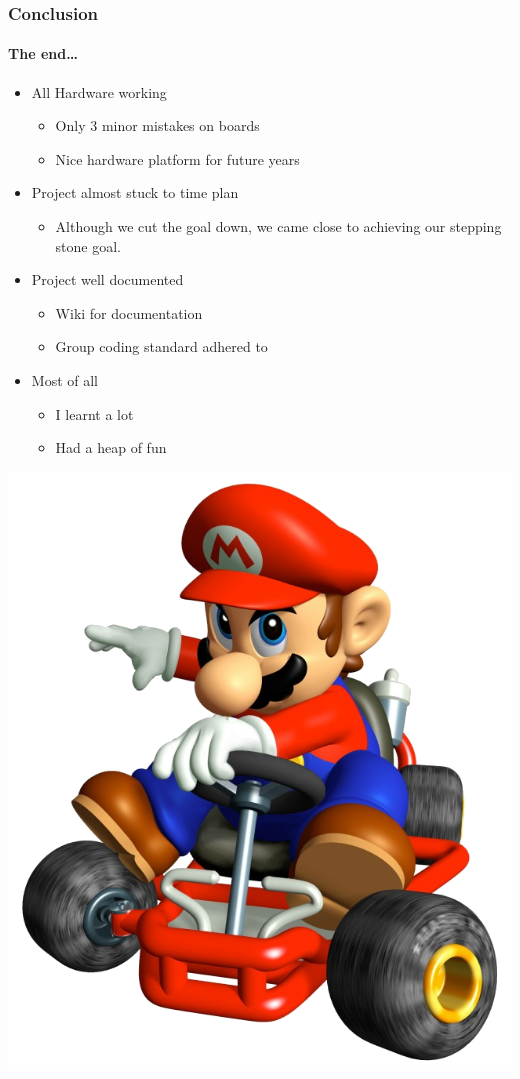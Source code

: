 \documentclass{beamer}
\begin{document}
\begin{frame}
\frametitle{Conclusion}
\framesubtitle{The end\ldots}
\begin{itemize}
\item All Hardware working
  \begin{itemize}
  \item Only 3 minor mistakes on boards
  \item Nice hardware platform for future years
  \end{itemize}
\item Project almost stuck to time plan
  \begin{itemize}
  \item Although we cut the goal down, we came close to achieving our stepping
  stone goal.
  \end{itemize}
\item Project well documented
  \begin{itemize}
  \item Wiki for documentation
  \item Group coding standard adhered to
  \end{itemize}
\item Most of all
  \begin{itemize}
  \item I learnt a lot
  \item Had a heap of fun
  \end{itemize}
\end{itemize}
\end{frame}

\begin{frame}
\begin{center}
\includegraphics[width=.70\textwidth]{Images/Mario.png}
\end{center}
\end{frame}
\end{document}
